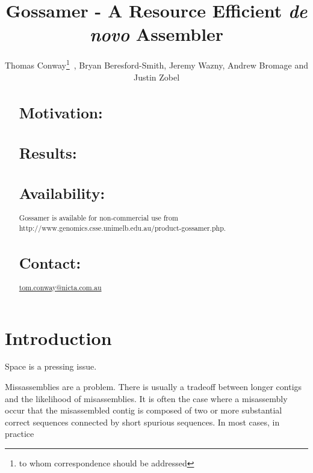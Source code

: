 \documentclass{bioinfo}
\begin{document}

\title[Gossamer]{Gossamer - A Resource Efficient {\em de novo} Assembler}
\author[Sample \textit{et~al}]{Thomas Conway\footnote{to whom correspondence should be addressed}\ , Bryan Beresford-Smith,
        Jeremy Wazny,        Andrew Bromage and        Justin Zobel }
\address{NICTA Victoria Research Laboratory, Department of Computer Science and Software Engineering, The University of Melbourne, Parkville, Australia\\
}





\maketitle

\begin{abstract}

\section{Motivation:}

\section{Results:}

\section{Availability:}
Gossamer is available for non-commercial use 
from http://www.genomics.csse.unimelb.edu.au/product-gossamer.php.

\section{Contact:} \href{tom.conway@nicta.com.au}{tom.conway@nicta.com.au}
\end{abstract}

\vspace{-1em}
\section{Introduction}

Space is a pressing issue.

Missassemblies are a problem.
There is usually a tradeoff between longer contigs and the likelihood of misassemblies.
It is often the case where a misassembly occur that the misassembled contig is composed of
two or more substantial correct sequences connected by short spurious sequences.
In most cases, in practice
\end{document}
